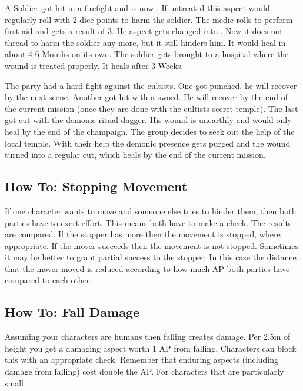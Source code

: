 \documentclass[11pt]{article}
\begin{document}
{\begin{pwexample}
A Soldier got hit in a firefight and is now . If untreated this aspect would regularly roll with 2 dice points to harm the soldier. The medic rolls to perform first aid and gets a result of 3. He aspect gets changed into . Now it does not thread to harm the soldier any more, but it still hinders him. It would heal in about 4-6 Months on its own. The soldier gets brought to a hospital where the wound is treated properly. It heals after 3 Weeks. 
\end{pwexample}

\begin{pwexample}
The party had a hard fight against the cultists. One got punched, he will recover by the next scene. Another got hit with a sword. He will recover by the end of the current mission (once they are done with the cultists secret temple). The last got cut with the demonic ritual dagger. His wound is unearthly and would only heal by the end of the champaign. The group decides to seek out the help of the local temple. With their help the demonic presence gets purged and the wound turned into a regular cut, which heals by the end of the current mission.
\end{pwexample}
\subsection{How To: Stopping Movement}
\label{sec:org0e9e3e5}
If one character wants to move and someone else tries to hinder them, then both parties have to exert effort. This means both have to make a check. The results are compared. If the stopper has more then the movement is stopped, where appropriate. If the mover succeeds then the movement is not stopped. Sometimes it may be better to grant partial success to the stopper. In this case the distance that the mover moved is reduced according to how much AP both parties have compared to each other.
\subsection{How To: Fall Damage}
\label{sec:org2f5841a}
Assuming your characters are humans then falling creates damage. Per 2.5m of height you get a damaging aspect worth 1 AP from falling. Characters can block this with an appropriate check. Remember that enduring aspects (including damage from falling) cost double the AP.
For characters that are particularly small

}
\end{document}
